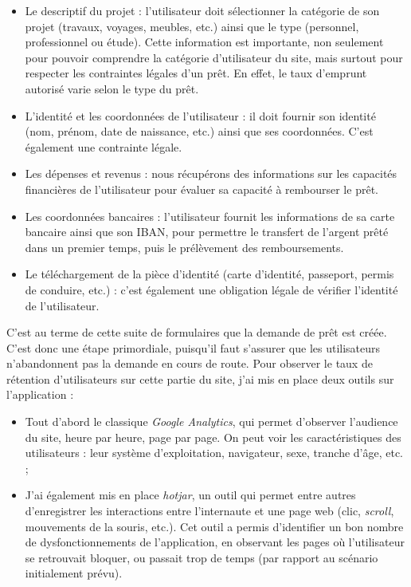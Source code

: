 \begin{itemize}
\tightlist
\item
  Le descriptif du projet : l'utilisateur doit sélectionner la catégorie
  de son projet (travaux, voyages, meubles, etc.) ainsi que le type
  (personnel, professionnel ou étude). Cette information est importante,
  non seulement pour pouvoir comprendre la catégorie d'utilisateur du
  site, mais surtout pour respecter les contraintes légales d'un prêt.
  En effet, le taux d'emprunt autorisé varie selon le type du prêt.
\item
  L'identité et les coordonnées de l'utilisateur : il doit fournir son
  identité (nom, prénom, date de naissance, etc.) ainsi que ses
  coordonnées. C'est également une contrainte légale.
\item
  Les dépenses et revenus : nous récupérons des informations sur les
  capacités financières de l'utilisateur pour évaluer sa capacité à
  rembourser le prêt.
\item
  Les coordonnées bancaires : l'utilisateur fournit les informations de
  sa carte bancaire ainsi que son IBAN, pour permettre le transfert de
  l'argent prêté dans un premier temps, puis le prélèvement des
  remboursements.
\item
  Le téléchargement de la pièce d'identité (carte d'identité, passeport,
  permis de conduire, etc.) : c'est également une obligation légale de
  vérifier l'identité de l'utilisateur.
\end{itemize}

\bigskip

C'est au terme de cette suite de formulaires que la demande de prêt est
créée. C'est donc une étape primordiale, puisqu'il faut s'assurer que
les utilisateurs n'abandonnent pas la demande en cours de route. Pour
observer le taux de rétention d'utilisateurs sur cette partie du site,
j'ai mis en place deux outils sur l'application :

\begin{itemize}
\tightlist
\item
  Tout d'abord le classique \emph{Google Analytics}, qui permet
  d'observer l'audience du site, heure par heure, page par page. On peut
  voir les caractéristiques des utilisateurs : leur système
  d'exploitation, navigateur, sexe, tranche d'âge, etc. ;
\item
  J'ai également mis en place \emph{hotjar}, un outil qui permet entre
  autres d'enregistrer les interactions entre l'internaute et une page
  web (clic, \emph{scroll}, mouvements de la souris, etc.). Cet outil a
  permis d'identifier un bon nombre de dysfonctionnements de
  l'application, en observant les pages où l'utilisateur se retrouvait
  bloquer, ou passait trop de temps (par rapport au scénario
  initialement prévu).
\end{itemize}

